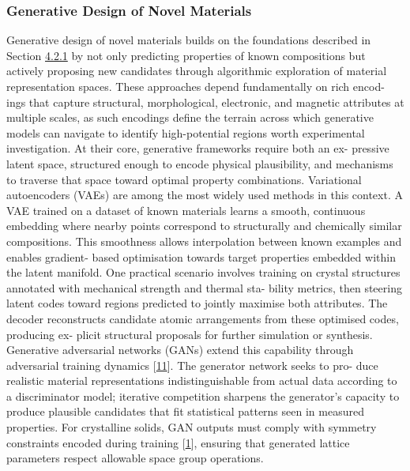 \documentclass[
]{article}
\begin{document}
\hypertarget{generative-design-of-novel-materials}{%
\subsubsection{Generative Design of Novel
Materials}\label{generative-design-of-novel-materials}}

Generative design of novel materials builds on the foundations described
in Section
\protect\hyperlink{predictive-modelling-of-material-performance}{4.2.1}
by not only predicting properties of known compositions but actively
proposing new candidates through algorithmic exploration of material
representation spaces. These approaches depend fundamentally on rich
encod- ings that capture structural, morphological, electronic, and
magnetic attributes at multiple scales, as such encodings define the
terrain across which generative models can navigate to identify
high-potential regions worth experimental investigation. At their core,
generative frameworks require both an ex- pressive latent space,
structured enough to encode physical plausibility, and mechanisms to
traverse that space toward optimal property combinations. Variational
autoencoders (VAEs) are among the most widely used methods in this
context. A VAE trained on a dataset of known materials learns a smooth,
continuous embedding where nearby points correspond to structurally and
chemically similar compositions. This smoothness allows interpolation
between known examples and enables gradient- based optimisation towards
target properties embedded within the latent manifold. One practical
scenario involves training on crystal structures annotated with
mechanical strength and thermal sta- bility metrics, then steering
latent codes toward regions predicted to jointly maximise both
attributes. The decoder reconstructs candidate atomic arrangements from
these optimised codes, producing ex- plicit structural proposals for
further simulation or synthesis. Generative adversarial networks (GANs)
extend this capability through adversarial training dynamics
{[}\protect\hyperlink{_bookmark51}{11}{]}. The generator network seeks
to pro- duce realistic material representations indistinguishable from
actual data according to a discriminator model; iterative competition
sharpens the generator's capacity to produce plausible candidates that
fit statistical patterns seen in measured properties. For crystalline
solids, GAN outputs must comply with symmetry constraints encoded during
training {[}\protect\hyperlink{_bookmark41}{1}{]}, ensuring that
generated lattice parameters respect allowable space group operations.
\end{document}
